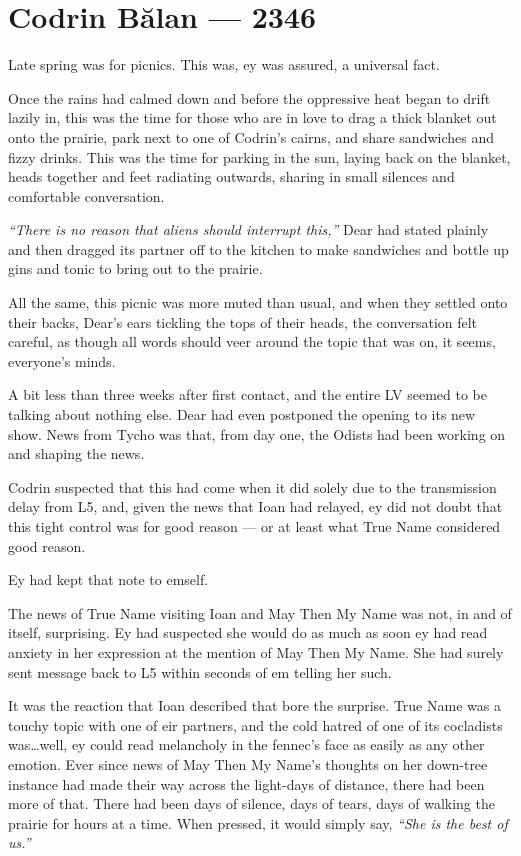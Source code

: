 \hypertarget{codrin-bux103lan-2346}{%
\chapter{Codrin Bălan — 2346}\label{codrin-bux103lan-2346}}

Late spring was for picnics. This was, ey was assured, a universal fact.

Once the rains had calmed down and before the oppressive heat began to drift lazily in, this was the time for those who are in love to drag a thick blanket out onto the prairie, park next to one of Codrin's cairns, and share sandwiches and fizzy drinks. This was the time for parking in the sun, laying back on the blanket, heads together and feet radiating outwards, sharing in small silences and comfortable conversation.

\emph{``There is no reason that aliens should interrupt this,''} Dear had stated plainly and then dragged its partner off to the kitchen to make sandwiches and bottle up gins and tonic to bring out to the prairie.

All the same, this picnic was more muted than usual, and when they settled onto their backs, Dear's ears tickling the tops of their heads, the conversation felt careful, as though all words should veer around the topic that was on, it seems, everyone's minds.

A bit less than three weeks after first contact, and the entire LV seemed to be talking about nothing else. Dear had even postponed the opening to its new show. News from Tycho was that, from day one, the Odists had been working on and shaping the news.

Codrin suspected that this had come when it did solely due to the transmission delay from L5, and, given the news that Ioan had relayed, ey did not doubt that this tight control was for good reason — or at least what True Name considered good reason.

Ey had kept that note to emself.

The news of True Name visiting Ioan and May Then My Name was not, in and of itself, surprising. Ey had suspected she would do as much as soon ey had read anxiety in her expression at the mention of May Then My Name. She had surely sent message back to L5 within seconds of em telling her such.

It was the reaction that Ioan described that bore the surprise. True Name was a touchy topic with one of eir partners, and the cold hatred of one of its cocladists was\ldots well, ey could read melancholy in the fennec's face as easily as any other emotion. Ever since news of May Then My Name's thoughts on her down-tree instance had made their way across the light-days of distance, there had been more of that. There had been days of silence, days of tears, days of walking the prairie for hours at a time. When pressed, it would simply say, \emph{``She is the best of us.''}

